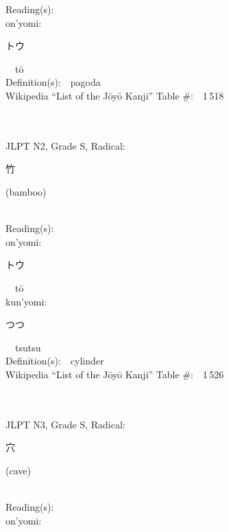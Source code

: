 \begin{multicols}{2}
Reading(s):\ \ \\
{\hspace*{1em}}on'yomi:\ \ \\
{\hspace*{2em}}{\begin{CJK}{UTF8}{min} トウ \end{CJK}}\ \ t\=o\ \ \\
Definition(s):\ \ pagoda \\
Wikipedia ``List of the J\=oy\=o Kanji'' Table \#:\ \ 1\,518 \\
\ \ \\
{\fontsize{34pt}{40pt}  }\ \ \\  %
{JLPT N2, Grade S, Radical:\ \ {\begin{CJK}{UTF8}{min} 竹 \end{CJK}} (bamboo) } \\
Reading(s):\ \ \\
{\hspace*{1em}}on'yomi:\ \ \\
{\hspace*{2em}}{\begin{CJK}{UTF8}{min} トウ \end{CJK}}\ \ t\=o\ \ \\
{\hspace*{1em}}kun'yomi:\ \ \\
{\hspace*{2em}}{\begin{CJK}{UTF8}{min} つつ \end{CJK}}\ \ tsutsu\ \ \\
Definition(s):\ \ cylinder \\
Wikipedia ``List of the J\=oy\=o Kanji'' Table \#:\ \ 1\,526 \\
\ \ \\
{\fontsize{34pt}{40pt}  }\ \ \\  %
{JLPT N3, Grade S, Radical:\ \ {\begin{CJK}{UTF8}{min} 穴 \end{CJK}} (cave) } \\
Reading(s):\ \ \\
{\hspace*{1em}}on'yomi:\ \ \\

\end{multicols}
